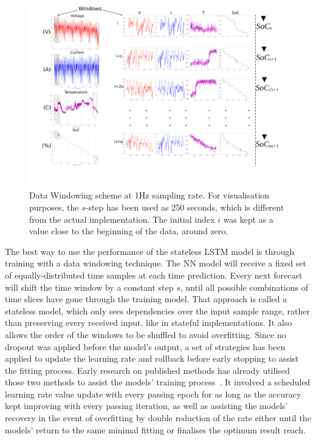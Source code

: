 %
%
\begin{landscape}
    \begin{figure}[t]
        \centering
        \includegraphics[width=\linewidth]{II_Body/images/Windowing4f-A3.jpg}
        \caption{Data Windowing scheme at 1Hz sampling rate. For visualisation purposes, the $s$-step has been used as 250 seconds, which is different from the actual implementation. The initial index $i$ was kept as a value close to the beginning of the data, around zero.}
        \label{fig:Windowing}
    \end{figure}
\end{landscape}
The best way to use the performance of the stateless LSTM model is through training with a data windowing technique.
The NN model will receive a fixed set of equally-distributed time samples at each time prediction.
Every next forecast will shift the time window by a constant step $s$, until all possible combinations of time slices have gone through the training model.
That approach is called a stateless model, which only sees dependencies over the input sample range, rather than preserving every received input, like in stateful implementations.
It also allows the order of the windows to be shuffled to avoid overfitting.
Since no dropout was applied before the model's output, a set of strategies has been applied to update the learning rate and rollback before early stopping to assist the fitting process.
{Early research on published methods has already utilised those two methods to assist the models' training process~\cite{sadykov_practical_2022}.
It involved a scheduled learning rate value update with every passing epoch for as long as the accuracy kept improving with every passing iteration, as well as assisting the models' recovery in the event of overfitting by double reduction of the rate either until the models' return to the same minimal fitting or finalises the optimum result reach.}
